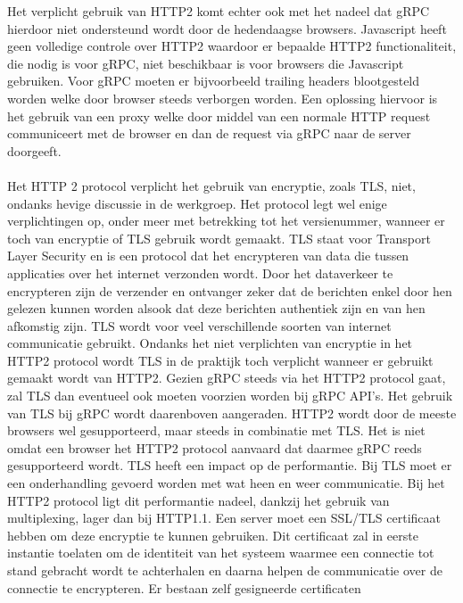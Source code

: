 Het verplicht gebruik van HTTP2 komt echter ook met het nadeel dat gRPC hierdoor niet ondersteund wordt door de hedendaagse browsers. Javascript heeft geen
volledige controle over HTTP2 waardoor er bepaalde HTTP2 functionaliteit, die nodig is voor gRPC, niet beschikbaar is voor browsers die Javascript gebruiken.
Voor gRPC moeten er bijvoorbeeld trailing headers blootgesteld worden welke door browser steeds verborgen worden. Een oplossing hiervoor is het gebruik van een proxy welke
door middel van een normale HTTP request communiceert met de browser en dan de request via gRPC naar de server doorgeeft.\newline
~\autocite{altexsoftgrpc}\\
~\autocite{yukutakahashi}\\

Het HTTP 2 protocol verplicht het gebruik van encryptie, zoals TLS, niet, ondanks hevige discussie in de werkgroep. Het protocol legt wel enige verplichtingen op,
onder meer met betrekking tot het versienummer, wanneer er toch van encryptie of TLS gebruik wordt gemaakt. TLS staat voor Transport Layer Security en is een protocol
dat het encrypteren van data die tussen applicaties over het internet verzonden wordt. Door het dataverkeer te encrypteren zijn de verzender en ontvanger zeker dat
de berichten enkel door hen gelezen kunnen worden alsook dat deze berichten authentiek zijn en van hen afkomstig zijn. TLS wordt voor veel verschillende soorten van internet communicatie gebruikt.
Ondanks het niet verplichten van encryptie in het HTTP2 protocol wordt TLS in de praktijk toch verplicht wanneer er gebruikt gemaakt wordt van HTTP2.
Gezien gRPC steeds via het HTTP2 protocol gaat, zal TLS dan eventueel ook moeten voorzien worden bij gRPC API's. Het gebruik van TLS bij gRPC wordt daarenboven aangeraden.
HTTP2 wordt door de meeste browsers wel gesupporteerd, maar steeds in combinatie met TLS. Het is niet omdat een browser het HTTP2 protocol aanvaard dat daarmee gRPC reeds
gesupporteerd wordt.\newline
TLS heeft een impact op de performantie. Bij TLS moet er een onderhandling gevoerd worden met wat heen en weer communicatie. Bij het HTTP2 protocol ligt dit performantie nadeel,
dankzij het gebruik van multiplexing, lager dan bij HTTP1.1.
Een server moet een SSL/TLS certificaat hebben om deze encryptie te kunnen gebruiken. Dit certificaat zal in eerste instantie toelaten om de identiteit van het systeem
waarmee een connectie tot stand gebracht wordt te achterhalen en daarna helpen de communicatie over de connectie te encrypteren. Er bestaan zelf gesigneerde certificaten
